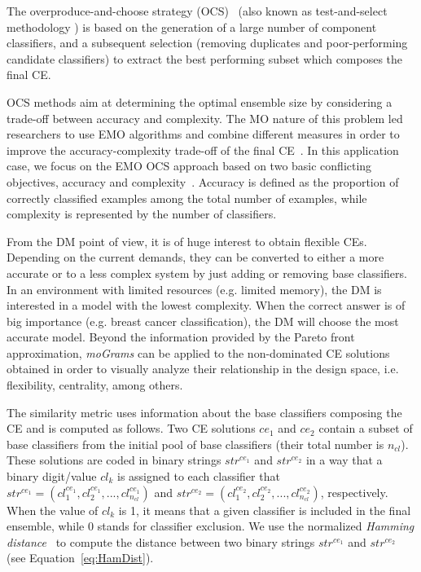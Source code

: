 \documentclass[journal]{IEEEtran}
\begin{document}
The overproduce-and-choose strategy (OCS)~\cite{Partridge96} (also known as test-and-select methodology \cite{Sharkey00}) is based on the generation of a large number of component classifiers, and a subsequent selection (removing duplicates and poor-performing candidate classifiers) to extract the best performing subset which composes the final CE. 

OCS methods aim at determining the optimal ensemble size by considering a trade-off between accuracy and complexity. 
The MO nature of this problem led researchers to use EMO algorithms and combine different measures in order to improve the accuracy-complexity trade-off of the final CE~\cite{Trawinski11,Trawinski2013,Oliveira05,Santos08}. In this application case, we focus on the EMO OCS approach based on two basic conflicting objectives, accuracy and complexity~\cite{Trawinski11}. Accuracy is defined as the proportion of correctly classified examples among the total number of examples, while complexity is represented by the number of classifiers.


From the DM point of view, it is of huge interest to obtain flexible CEs. Depending on the current demands, they can be converted to either a more accurate or to a less complex system by just adding or removing base classifiers. 
In an environment with limited resources (e.g. limited memory), the DM is interested in a model with the lowest complexity. When the correct answer is of big importance (e.g. breast cancer classification), the DM will choose the most accurate model. Beyond the information provided by the Pareto front approximation, \emph{moGrams} can be applied to the non-dominated CE solutions obtained in order to visually analyze their relationship in the design space, i.e. flexibility, centrality, among others.


The similarity metric uses information about the base classifiers composing the CE and is computed as follows. Two CE solutions $ce_1$ and $ce_2$ contain a subset of base classifiers from the initial pool of base classifiers (their total number is $n_{cl}$). These solutions are coded in binary strings $str^{ce_1}$ and $str^{ce_2}$ in a way that a binary digit/value $cl_k$ is assigned to each classifier that $str^{ce_1} = (cl_{1}^{ce_1}, cl_{2}^{ce_1}, ..., cl_{n_{cl}}^{ce_1})$ and $str^{ce_2} = (cl_{1}^{ce_2}, cl_{2}^{ce_2}, ..., cl_{n_{cl}}^{ce_2})$, respectively. When the value of $cl_k$ is 1, it means that a given classifier is included in the final ensemble, while 0 stands for classifier exclusion. We use the normalized \emph{Hamming distance}~\cite{hamming50} to compute the distance between two binary strings $str^{ce_1}$ and $str^{ce_2}$ (see Equation~\ref{eq:HamDist}).  
\end{document}
